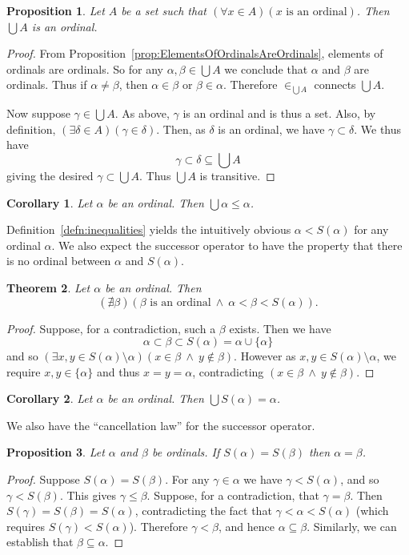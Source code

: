 \documentclass[a4paper,11pt]{article}
\theoremstyle{plain}
\newtheorem{thm}{Theorem}[subsection]
\newtheorem{prop}[thm]{Proposition}
\newtheorem*{cor}{Corollary}
\theoremstyle{definition}
\theoremstyle{remark}
\begin{document}
\begin{prop}
\label{prop:UnionOrdinals}
Let $A$ be a set such that $(\forall x\in A)(x \text{ is an ordinal})$. Then $\bigcup A$ is an ordinal.
\end{prop}
\begin{proof}
From Proposition~\ref{prop:ElementsOfOrdinalsAreOrdinals}, elements of ordinals are ordinals. So for any $\alpha, \beta\in\bigcup A$ we conclude that $\alpha$ and $\beta$ are ordinals. Thus if $\alpha\neq\beta$, then $\alpha\in\beta$ or $\beta\in\alpha$. Therefore $\in_{\bigcup A}$ connects $\bigcup A$.

Now suppose $\gamma \in \bigcup A$. As above, $\gamma$ is an ordinal and is thus a set. Also, by definition, $(\exists \delta\in A)(\gamma\in\delta)$. Then, as $\delta$ is an ordinal, we have $\gamma\subset\delta$. We thus have
\[\gamma\subset\delta\subseteq\bigcup A\]
giving the desired $\gamma\subset\bigcup A$. Thus $\bigcup A$ is transitive.
\end{proof}

\begin{cor}
Let $\alpha$ be an ordinal. Then $\bigcup\alpha \leq \alpha$.
\end{cor}

Definition~\ref{defn:inequalities} yields the intuitively obvious $\alpha < S(\alpha)$ for any ordinal $\alpha$. We also expect the successor operator to have the property that there is no ordinal between $\alpha$ and $S(\alpha)$.

\begin{thm}
Let $\alpha$ be an ordinal. Then
\[(\nexists \beta)(\beta \text{ is an ordinal}\ \land \ \alpha<\beta<S(\alpha)).\]
\end{thm}
\begin{proof}
Suppose, for a contradiction, such a $\beta$ exists. Then we have 
\[\alpha \subset \beta \subset S(\alpha) = \alpha \cup \{\alpha\}\]
and so $(\exists x,y\in S(\alpha)\setminus\alpha)(x\in\beta\ \land \ y\notin\beta)$. However as $x,y\in S(\alpha)\setminus\alpha$, we require $x,y\in\{\alpha\}$ and thus $x=y=\alpha$, contradicting $(x\in\beta \ \land \ y\notin\beta)$.
\end{proof}
\begin{cor}
Let $\alpha$ be an ordinal. Then $\bigcup S(\alpha) = \alpha$.
\end{cor}

We also have the ``cancellation law'' for the successor operator.

\begin{prop}
Let $\alpha$ and $\beta$ be ordinals. If $S(\alpha) = S(\beta)$ then $\alpha = \beta$.
\end{prop}
\begin{proof}
Suppose $S(\alpha)=S(\beta)$. For any $\gamma\in\alpha$ we have $\gamma < S(\alpha)$, and so $\gamma < S(\beta)$. This gives $\gamma \leq \beta$. Suppose, for a contradiction, that $\gamma = \beta$. Then $S(\gamma) = S(\beta) = S(\alpha)$, contradicting the fact that $\gamma < \alpha < S(\alpha)$ (which requires $S(\gamma) < S(\alpha)$). Therefore $\gamma < \beta$, and hence $\alpha\subseteq\beta$. Similarly, we can establish that $\beta\subseteq\alpha$.
\end{proof}
\end{document}
